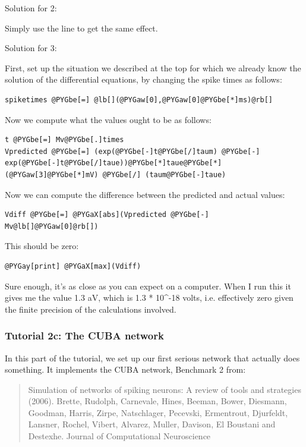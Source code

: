 \documentclass[letterpaper,10pt,english]{manual}
\begin{document}
Solution for 2:

Simply use the line  to get the same effect.

Solution for 3:

First, set up the situation we described at the top for which we
already know the solution of the differential equations, by changing
the spike times as follows:

\begin{Verbatim}[commandchars=@\[\]]
spiketimes @PYGbe[=] @lb[](@PYGaw[0],@PYGaw[0]@PYGbe[*]ms)@rb[]
\end{Verbatim}

Now we compute what the values ought to be as follows:

\begin{Verbatim}[commandchars=@\[\]]
t @PYGbe[=] Mv@PYGbe[.]times
Vpredicted @PYGbe[=] (exp(@PYGbe[-]t@PYGbe[/]taum) @PYGbe[-] exp(@PYGbe[-]t@PYGbe[/]taue))@PYGbe[*]taue@PYGbe[*](@PYGaw[3]@PYGbe[*]mV) @PYGbe[/] (taum@PYGbe[-]taue)
\end{Verbatim}

Now we can compute the difference between the predicted and actual values:

\begin{Verbatim}[commandchars=@\[\]]
Vdiff @PYGbe[=] @PYGaX[abs](Vpredicted @PYGbe[-] Mv@lb[]@PYGaw[0]@rb[])
\end{Verbatim}

This should be zero:

\begin{Verbatim}[commandchars=@\[\]]
@PYGay[print] @PYGaX[max](Vdiff)
\end{Verbatim}

Sure enough, it's as close as you can expect on a computer. When I run this
it gives me the value 1.3 aV, which is 1.3 * 10\textasciicircum{}-18 volts, i.e. effectively
zero given the finite precision of the calculations involved.

\resetcurrentobjects


\subsubsection{Tutorial 2c: The CUBA network}

In this part of the tutorial, we set up our first serious network
that actually does something. It implements the CUBA network, Benchmark 2 from:
\begin{quote}

Simulation of networks of spiking neurons: A review of tools and strategies (2006).
Brette, Rudolph, Carnevale, Hines, Beeman, Bower, Diesmann, Goodman, Harris, Zirpe,
Natschlager, Pecevski, Ermentrout, Djurfeldt, Lansner, Rochel, Vibert, Alvarez, Muller,
Davison, El Boustani and Destexhe.
Journal of Computational Neuroscience
\end{quote}
\end{document}
